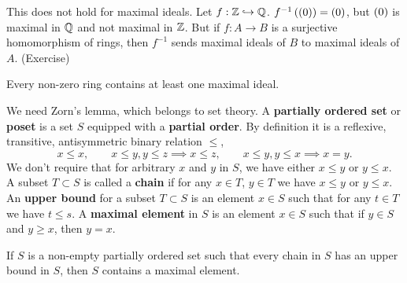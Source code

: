 \begin{remark}
This does not hold for maximal ideals. Let $ f : \mathbb{Z} \hookrightarrow \mathbb{Q} $. $ f^{-1}\left( \left( 0 \right) \right) = \left( 0 \right) $, but $ \left( 0 \right) $ is maximal in $ \mathbb{Q} $ and not maximal in $ \mathbb{Z} $. But if $ f : A \to B $ is a surjective homomorphism of rings, then $ f^{-1} $ sends maximal ideals of $ B $ to maximal ideals of $ A $. (Exercise)
\end{remark}

\begin{theorem}
\label{thm:4.6}
Every non-zero ring contains at least one maximal ideal.
\end{theorem}

We need Zorn's lemma, which belongs to set theory. A \textbf{partially ordered set} or \textbf{poset} is a set $ S $ equipped with a \textbf{partial order}. By definition it is a reflexive, transitive, antisymmetric binary relation $ \le $,
$$ x \le x, \qquad x \le y, y \le z \implies x \le z, \qquad x \le y, y \le x \implies x = y. $$
We don't require that for arbitrary $ x $ and $ y $ in $ S $, we have either $ x \le y $ or $ y \le x $. A subset $ T \subset S $ is called a \textbf{chain} if for any $ x \in T $, $ y \in T $ we have $ x \le y $ or $ y \le x $. An \textbf{upper bound} for a subset $ T \subset S $ is an element $ x \in S $ such that for any $ t \in T $ we have $ t \le s $. A \textbf{maximal element} in $ S $ is an element $ x \in S $ such that if $ y \in S $ and $ y \ge x $, then $ y = x $.


\begin{theorem}
If $ S $ is a non-empty partially ordered set such that every chain in $ S $ has an upper bound in $ S $, then $ S $ contains a maximal element.
\end{theorem}


